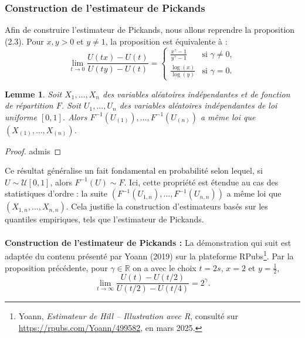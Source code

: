\documentclass{article}
\theoremstyle{plain}
\theoremstyle{definition}
\theoremstyle{plain}
\newtheorem{lemma}[definition]{Lemme}
\begin{document}
\subsubsection{Construction de l'estimateur de Pickands}

\noindent Afin de construire l'estimateur de Pickands, nous allons reprendre la proposition (2.3). Pour \(x,y > 0\) et \(y \neq 1\), la proposition est équivalente à :
\[
\lim_{t \to 0} \frac{U(tx) - U(t)}{U(ty) - U(t)} = 
\begin{cases} 
\frac{x^\gamma - 1}{y^\gamma - 1} & \text{si } \gamma \neq 0, \\
\frac{\log(x)}{\log(y)} & \text{si } \gamma = 0.
\end{cases}
\]
\newline

\begin{lemma}
Soit \(X_1, \dots, X_n\) des variables aléatoires indépendantes et de fonction de répartition \(F\).
Soit \(U_1, \dots, U_n\) des variables aléatoires indépendantes de loi uniforme \(\left[0,1\right]\). Alors \(F^{-1}(U_{(1)}), \dots, F^{-1}(U_{(n)})\) a même loi que \((X_{(1)}, \dots, X_{(n)})\).
\end{lemma}

\begin{proof}
admis
\end{proof}
\noindent
Ce résultat généralise un fait fondamental en probabilité selon lequel, si \(U \sim \mathcal{U}[0,1]\), alors \(F^{-1}(U) \sim F\). Ici, cette propriété est étendue au cas des statistiques d'ordre : la suite \((F^{-1}(U_{1,n}), \dots, F^{-1}(U_{n,n}))\) a même loi que \((X_{1,n}, \dots, X_{n,n})\). Cela justifie la construction d’estimateurs basés sur les quantiles empiriques, tels que l’estimateur de Pickands.
\\
\\
\noindent \textbf{Construction de l'estimateur de Pickands :}
\noindent La démonstration qui suit est adaptée du contenu présenté par Yoann (2019) sur la plateforme RPubs\footnote{Yoann, \textit{Estimateur de Hill – Illustration avec R}, consulté sur \url{https://rpubs.com/Yoann/499582}, en mars 2025.}.
\noindent Par la proposition précédente, pour $\gamma \in \mathbb{R}$ on a avec le choix $t = 2s$, $x = 2$ et $y = \frac{1}{2}$,
\[
\lim_{t \to \infty} \frac{U(t) - U(t/2)}{U(t/2) - U(t/4)} = 2^{\gamma}.
\]
\end{document}
